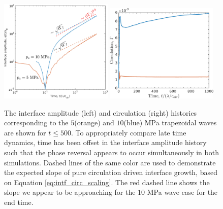 \begin{figure}[h] 
  \centering
  \includegraphics[width=0.48\textwidth]{./figs/lung_figs/interface_multi-amp_loglog_roe_extra}
  \includegraphics[width=0.48\textwidth]{./figs/lung_figs/circulation_multi-amp2_roe_fixed}
  \caption[The interface and circulation dependence on wave amplitude
  at long time]{The interface amplitude (left) and circulation (right)
    histories corresponding to the $5$(orange) and $10$(blue) MPa
    trapezoidal waves are shown for $t\leq 500$. To appropriately
    compare late time dynamics, time has been offset in the interface
    amplitude history such that the phase reversal appears to occur
    simultaneously in both simulations. Dashed lines of the same color
    are used to demonstrate the expected slope of pure circulation
    driven interface growth, based on Equation
    \eqref{eq:intf_circ_scaling}. The red dashed line shows the slope we
    appear to be approaching for the $10$ MPa wave case for the end time.}
  \label{fig:trapz_circ_interface_loglog}
\end{figure}
%

